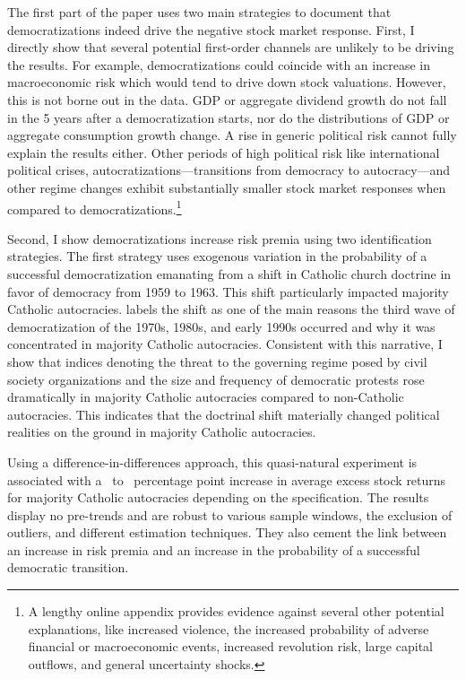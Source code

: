 \documentclass[12pt]{article}
\numberwithin{equation}{section}
\begin{document}
The first part of the paper uses two main strategies to document that democratizations indeed drive the negative stock market response.  First, I directly show that several potential first-order channels are unlikely to be driving the results.  For example, democratizations could coincide with an increase in macroeconomic risk which would tend to drive down stock valuations. However, this is not borne out in the data. GDP or aggregate dividend growth do not fall in the 5 years after a democratization starts, nor do the distributions of GDP or aggregate consumption growth change.  A rise in generic political risk cannot fully explain the results either. Other periods of high political risk like international political crises, autocratizations---transitions from democracy to autocracy---and other regime changes exhibit substantially smaller stock market responses when compared to democratizations.\footnote{A lengthy online appendix provides evidence against several other potential explanations, like increased violence, the increased probability of adverse financial or macroeconomic events, increased revolution risk, large capital outflows, and general uncertainty shocks.}

Second, I show democratizations increase risk premia using two identification strategies.  The first strategy uses exogenous variation in the probability of a successful democratization emanating from a shift in Catholic church doctrine in favor of democracy from 1959 to 1963. This shift particularly impacted majority Catholic autocracies. \cite{Huntington1991} labels the shift as one of the main reasons the third wave of democratization of the 1970s, 1980s, and early 1990s occurred and why it was concentrated in majority Catholic autocracies. Consistent with this narrative,  I show that indices denoting the threat to the governing regime posed by civil society organizations and the size and frequency of democratic protests rose dramatically in majority Catholic autocracies compared to non-Catholic autocracies. This indicates that the doctrinal shift materially changed political realities on the ground in majority Catholic autocracies. 

Using a difference-in-differences approach, this quasi-natural experiment is associated with a \tabSevenLow\ to \tabSevenHigh\ percentage point increase in average excess stock returns for majority Catholic autocracies depending on the specification. The results display no pre-trends and are robust to various sample windows, the exclusion of outliers, and different estimation techniques. They also cement the link between an increase in risk premia and an increase in the probability of a successful democratic transition.
\end{document}
